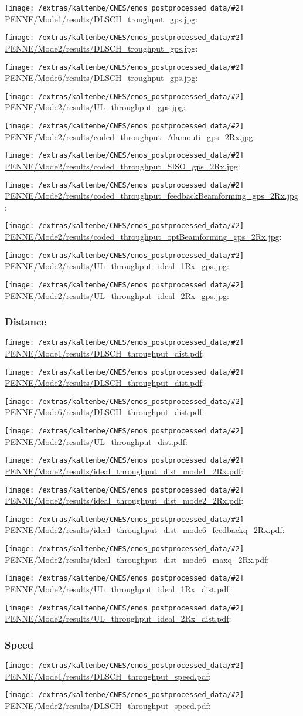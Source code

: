 \documentclass[a4paper,10pt]{article}
\newcommand{\printfile}[2][]{
 \begin{minipage}{8cm}
  \centering
  \texttt{[image: /extras/kaltenbe/CNES/emos\_postprocessed\_data/\#2]}
  \url{#2}: #1

 \end{minipage}
}
\begin{document}
\printfile{PENNE/Mode1/results/DLSCH_troughput_gps.jpg}
\printfile{PENNE/Mode2/results/DLSCH_troughput_gps.jpg}

\printfile{PENNE/Mode6/results/DLSCH_troughput_gps.jpg}
\printfile{PENNE/Mode2/results/UL_throughput_gps.jpg}

\printfile{PENNE/Mode2/results/coded_throughput_Alamouti_gps_2Rx.jpg}
\printfile{PENNE/Mode2/results/coded_throughput_SISO_gps_2Rx.jpg}

\printfile{PENNE/Mode2/results/coded_throughput_feedbackBeamforming_gps_2Rx.jpg}
\printfile{PENNE/Mode2/results/coded_throughput_optBeamforming_gps_2Rx.jpg}

\printfile{PENNE/Mode2/results/UL_throughput_ideal_1Rx_gps.jpg}
\printfile{PENNE/Mode2/results/UL_throughput_ideal_2Rx_gps.jpg}

\subsubsection{Distance}

\printfile{PENNE/Mode1/results/DLSCH_throughput_dist.pdf}
\printfile{PENNE/Mode2/results/DLSCH_throughput_dist.pdf}

\printfile{PENNE/Mode6/results/DLSCH_throughput_dist.pdf}
\printfile{PENNE/Mode2/results/UL_throughput_dist.pdf}


\printfile{PENNE/Mode2/results/ideal_throughput_dist_mode1_2Rx.pdf}
%
\printfile{PENNE/Mode2/results/ideal_throughput_dist_mode2_2Rx.pdf}

\printfile{PENNE/Mode2/results/ideal_throughput_dist_mode6_feedbackq_2Rx.pdf}
%
\printfile{PENNE/Mode2/results/ideal_throughput_dist_mode6_maxq_2Rx.pdf}

\printfile{PENNE/Mode2/results/UL_throughput_ideal_1Rx_dist.pdf}
\printfile{PENNE/Mode2/results/UL_throughput_ideal_2Rx_dist.pdf}

\subsubsection{Speed}

\printfile{PENNE/Mode1/results/DLSCH_throughput_speed.pdf}
\printfile{PENNE/Mode2/results/DLSCH_throughput_speed.pdf}
\end{document}
